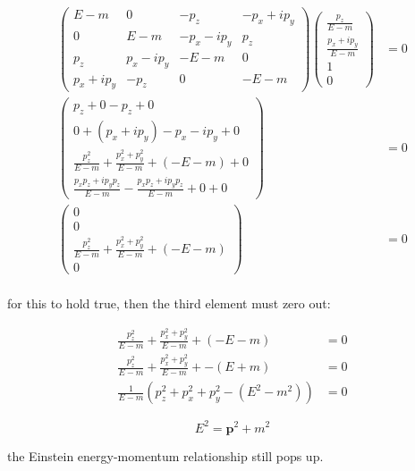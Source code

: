 \documentclass[11pt]{article}
\theoremstyle{definition}
\begin{document}
\begin{align}
    \begin{pmatrix}
        E-m & 0 & -p_{z} & - p_{x} + ip_{y}\\
        0 & E-m & - p_{x} - ip_{y} & p_{z}\\
        p_{z} & p_{x} - ip_{y} & -E-m & 0\\
        p_{x} + ip_{y} & -p_{z} & 0 & -E-m
    \end{pmatrix}
    \begin{pmatrix}
        \frac{p_z}{E-m}\\
        \frac{p_x + ip_y}{E-m}\\
        1\\
        0
    \end{pmatrix}  &= 0\\
    \begin{pmatrix}
        p_z + 0 - p_z + 0\\
        0 + (p_x+ip_y) -p_x-ip_y + 0\\
        \frac{p_z^2}{E-m} + \frac{p_x^2 + p_y^2}{E-m} + (-E-m) + 0\\
        \frac{p_xp_z + ip_yp_z}{E-m} - \frac{p_xp_z + ip_yp_z}{E-m} + 0 + 0
    \end{pmatrix} &= 0\\
    \begin{pmatrix}
        0\\
        0\\
        \frac{p_z^2}{E-m} + \frac{p_x^2 + p_y^2}{E-m} + (-E-m)\\
        0
    \end{pmatrix} &= 0\\
\end{align}

for this to hold true, then the third element must zero out:

\begin{align}
    \frac{p_z^2}{E-m} + \frac{p_x^2 + p_y^2}{E-m} + (-E-m) &= 0\\
    \frac{p_z^2}{E-m} + \frac{p_x^2 + p_y^2}{E-m} + -(E+m) &= 0\\
    \frac{1}{E-m} \left(p_z^2 + p_x^2 + p_y^2 - (E^2-m^2) \right) &= 0
\end{align}

\begin{equation}
\boxed{
    E^2 = \mathbf{p}^2 + m^2
}
\end{equation}

the Einstein energy-momentum relationship still pops up.
\end{document}
